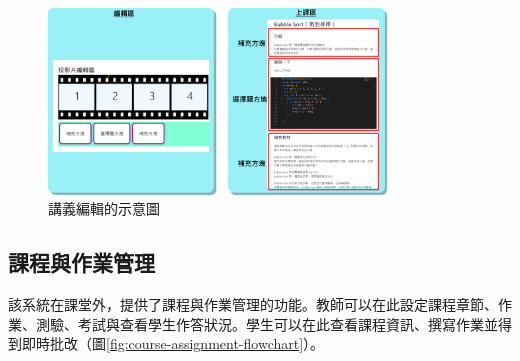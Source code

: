 \begin{enumerate}

  \begin{figure}[H]
    \centering
    \includegraphics[width=0.8\textwidth]{images/timezone.png}
    \caption{講義編輯的示意圖}
    \label{fig:edit}
  \end{figure}

\end{enumerate}

\subsection{課程與作業管理}
\label{sec:course-assignment}

該系統在課堂外，提供了課程與作業管理的功能。教師可以在此設定課程章節、作業、測驗、考試與查看學生作答狀況。學生可以在此查看課程資訊、撰寫作業並得到即時批改（圖\ref{fig:course-assignment-flowchart}）。

